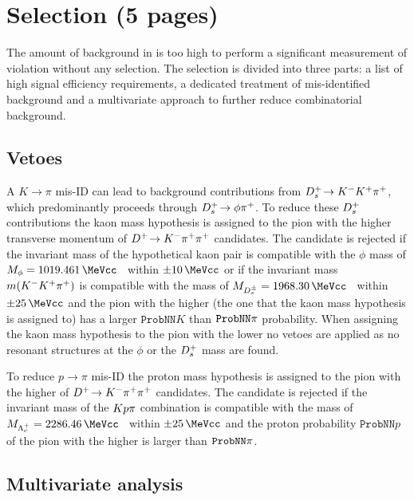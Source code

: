 
\section{Selection (5 pages)}
\label{sec:b02dd:selection}

The amount of background in \BdToDD is too high to perform a significant
measurement of \CP violation without any selection. The selection is divided
into three parts: a list of high signal efficiency requirements, a dedicated
treatment of mis-identified background and a multivariate approach to further
reduce combinatorial background.

\subsection{Vetoes}
\label{sec:b02dd:selection:vetoes}

A $K\rightarrow\pi$ mis-ID can lead to background contributions from
${{D}^+_{s}}\!\rightarrow {\ensuremath{{K}^-}}{\ensuremath{{K}^+}}{\ensuremath{{\pi}^+}}$, which predominantly proceeds through ${{D}^+_{s}}\!\rightarrow \phi{\ensuremath{{\pi}^+}}$. To reduce
these ${{D}^+_{s}}$ contributions the kaon mass hypothesis is assigned to the pion
with the higher transverse momentum of ${{D}^+}\!\rightarrow {\ensuremath{{K}^-}}{\ensuremath{{\pi}^+}}{\ensuremath{{\pi}^+}}$ candidates. The candidate
is rejected if the invariant mass of the hypothetical kaon pair is compatible
with the $\phi$ mass of $M_{\phi} = \SI{1019.461}{\MeVcc}$~\cite{PDG2014}
within $\pm\SI{10}{\MeVcc}$ or if the invariant mass $m({{K}^-}{{K}^+}{{\pi}^+})$ is
compatible with the \Dsp mass of $M_{\Dspm} =
\SI{1968.30}{\MeVcc}$~\cite{PDG2014} within $\pm\SI{25}{\MeVcc}$ and the pion
with the higher \pT (the one that the kaon mass hypothesis is assigned to) has
a larger $\texttt{ProbNN}K$ than $\texttt{ProbNN}{\ensuremath{\pi}}$ probability. When
assigning the kaon mass hypothesis to the pion with the lower \pT no vetoes
are applied as no resonant structures at the $\phi$ or the ${{D}^+_{s}}$ mass are
found.

To reduce $p\rightarrow\pi$ mis-ID the proton mass hypothesis is assigned to
the pion with the higher \pT of ${{D}^+}\!\rightarrow {\ensuremath{{K}^-}}{\ensuremath{{\pi}^+}}{\ensuremath{{\pi}^+}}$ candidates. The candidate is
rejected if the invariant mass of the ${K}{p}{\pi}$ combination is
compatible with the \Lc mass of $M_{\Lc} =
\SI{2286.46}{\MeVcc}$~\cite{PDG2014} within $\pm\SI{25}{\MeVcc}$ and the
proton probability $\texttt{ProbNN}p$ of the pion with the higher \pT is
larger than $\texttt{ProbNN}{\ensuremath{\pi}}$.

\subsection{Multivariate analysis}
\label{sec:b02dd:selection:mva}